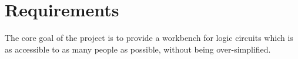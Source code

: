 \chapter{Requirements}
The core goal of the project is to provide a workbench for logic circuits which is as accessible to as many people as possible, without being over-simplified.


